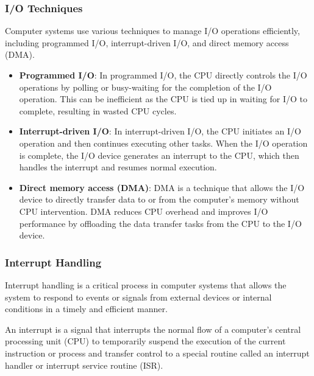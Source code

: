 \documentclass[12pt,a4paper]{article}
\begin{document}
\subsubsection*{I/O Techniques}
Computer systems use various techniques to manage I/O operations efficiently, including programmed I/O, interrupt-driven I/O, and direct memory access (DMA).
\begin{itemize}
    \item \textbf{Programmed I/O}: In programmed I/O, the CPU directly controls the I/O operations by polling or busy-waiting for the completion of the I/O operation. This can be inefficient as the CPU is tied up in waiting for I/O to complete, resulting in wasted CPU cycles.
    \item \textbf{Interrupt-driven I/O}: In interrupt-driven I/O, the CPU initiates an I/O operation and then continues executing other tasks. When the I/O operation is complete, the I/O device generates an interrupt to the CPU, which then handles the interrupt and resumes normal execution.
    \item \textbf{Direct memory access (DMA)}: DMA is a technique that allows the I/O device to directly transfer data to or from the computer's memory without CPU intervention. DMA reduces CPU overhead and improves I/O performance by offloading the data transfer tasks from the CPU to the I/O device.
\end{itemize}

\subsubsection*{Interrupt Handling}
Interrupt handling is a critical process in computer systems that allows the system to respond to events or signals from external devices or internal conditions in a timely and efficient manner.

An interrupt is a signal that interrupts the normal flow of a computer's central processing unit (CPU) to temporarily suspend the execution of the current instruction or process and transfer control to a special routine called an interrupt handler or interrupt service routine (ISR).
\end{document}

